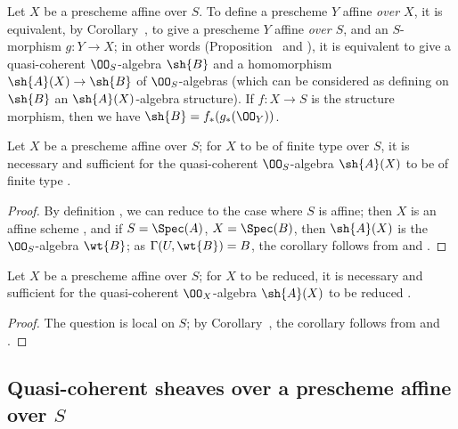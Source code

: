 \begin{env}[1.3.6]
\label{2.1.3.6}
Let $X$ be a prescheme affine over $S$.
To define a prescheme $Y$ affine \emph{over $X$}, it is equivalent, by Corollary~, to give a prescheme $Y$ affine \emph{over $S$}, and an $S$-morphism $g:Y\to X$; in other words (Proposition~ and ), it is equivalent to give a quasi-coherent $\OO_S$-algebra $\sh{B}$ and a homomorphism $\sh{A}(X)\to\sh{B}$ of $\OO_S$-algebras (which can be considered as defining on $\sh{B}$ an $\sh{A}(X)$-algebra structure).
If $f:X\to S$ is the structure morphism, then we have $\sh{B}=f_*(g_*(\OO_Y))$.
\end{env}

\begin{cor}[1.3.7]
\label{2.1.3.7}
Let $X$ be a prescheme affine over $S$; for $X$ to be of finite type over $S$, it is necessary and sufficient for the quasi-coherent $\OO_S$-algebra $\sh{A}(X)$ to be of finite type .
\end{cor}

\begin{proof}
\label{proof-2.1.3.7}
By definition , we can reduce to the case where $S$ is affine; then $X$ is an affine scheme , and if $S=\Spec(A)$, $X=\Spec(B)$, then $\sh{A}(X)$ is the $\OO_S$-algebra $\wt{B}$; as $\Gamma(U,\wt{B})=B$, the corollary follows from  and .
\end{proof}

\begin{cor}[1.3.8]
\label{2.1.3.8}
Let $X$ be a prescheme affine over $S$; for $X$ to be reduced, it is necessary and sufficient for the quasi-coherent $\OO_X$-algebra $\sh{A}(X)$ to be reduced .
\end{cor}

\begin{proof}
\label{proof-2.1.3.8}
The question is local on $S$; by Corollary~, the corollary follows from  and .
\end{proof}

\subsection{Quasi-coherent sheaves over a prescheme affine over $S$}
\label{subsection:quasi-coherent-sheaves-on-prescheme-affine-over}

